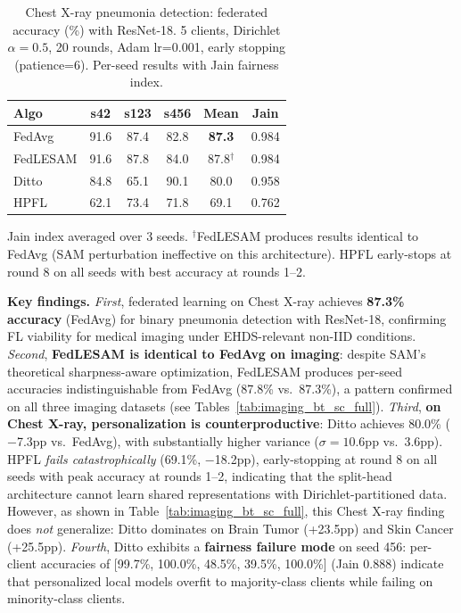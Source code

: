 \documentclass[conference]{IEEEtran}
\begin{document}
\begin{table}[htbp]
\centering
\caption{Chest X-ray pneumonia detection: federated accuracy (\%) with ResNet-18. 5 clients, Dirichlet $\alpha{=}0.5$, 20 rounds, Adam lr=0.001, early stopping (patience=6). Per-seed results with Jain fairness index.}
\label{tab:imaging_chest}
\small
\begin{tabular}{lccccc}
\toprule
\textbf{Algo} & \textbf{s42} & \textbf{s123} & \textbf{s456} & \textbf{Mean} & \textbf{Jain} \\
\midrule
FedAvg & 91.6 & 87.4 & 82.8 & \textbf{87.3} & 0.984 \\
FedLESAM & 91.6 & 87.8 & 84.0 & 87.8$^\dagger$ & 0.984 \\
Ditto & 84.8 & 65.1 & 90.1 & 80.0 & 0.958 \\
HPFL & 62.1 & 73.4 & 71.8 & 69.1 & 0.762 \\
\bottomrule
\end{tabular}

\vspace{1mm}
\footnotesize{Jain index averaged over 3 seeds. $^\dagger$FedLESAM produces results identical to FedAvg (SAM perturbation ineffective on this architecture). HPFL early-stops at round 8 on all seeds with best accuracy at rounds 1--2.}
\end{table}

\textbf{Key findings.} \textit{First}, federated learning on Chest X-ray achieves \textbf{87.3\% accuracy} (FedAvg) for binary pneumonia detection with ResNet-18, confirming FL viability for medical imaging under EHDS-relevant non-IID conditions. \textit{Second}, \textbf{FedLESAM is identical to FedAvg on imaging}: despite SAM's theoretical sharpness-aware optimization, FedLESAM produces per-seed accuracies indistinguishable from FedAvg (87.8\% vs.\ 87.3\%), a pattern confirmed on all three imaging datasets (see Tables~\ref{tab:imaging_bt_sc_full}). \textit{Third}, \textbf{on Chest X-ray, personalization is counterproductive}: Ditto achieves 80.0\% ($-$7.3pp vs.\ FedAvg), with substantially higher variance ($\sigma{=}10.6$pp vs.\ 3.6pp). HPFL \textit{fails catastrophically} (69.1\%, $-$18.2pp), early-stopping at round 8 on all seeds with peak accuracy at rounds 1--2, indicating that the split-head architecture cannot learn shared representations with Dirichlet-partitioned data. However, as shown in Table~\ref{tab:imaging_bt_sc_full}, this Chest X-ray finding does \textit{not} generalize: Ditto dominates on Brain Tumor (+23.5pp) and Skin Cancer (+25.5pp). \textit{Fourth}, Ditto exhibits a \textbf{fairness failure mode} on seed 456: per-client accuracies of [99.7\%, 100.0\%, 48.5\%, 39.5\%, 100.0\%] (Jain 0.888) indicate that personalized local models overfit to majority-class clients while failing on minority-class clients.
\end{document}
